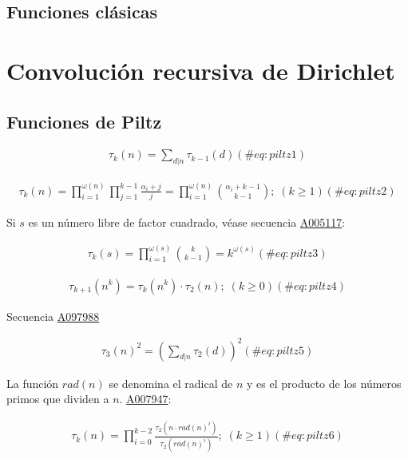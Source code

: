 \documentclass[
  letterpaper,
  DIV=11,
  numbers=noendperiod]{scrreprt}
\begin{document}
\hypertarget{funciones-cluxe1sicas}{%
\subsection{Funciones clásicas}\label{funciones-cluxe1sicas}}

\hypertarget{convoluciuxf3n-recursiva-de-dirichlet}{%
\section{Convolución recursiva de
Dirichlet}\label{convoluciuxf3n-recursiva-de-dirichlet}}

\hypertarget{funciones-de-piltz}{%
\subsection{Funciones de Piltz}\label{funciones-de-piltz}}

\begin{multline}
\tau_{k}(n)=\sum_{d|n}{\tau_{k-1}(d)}
(\#eq:piltz1)
\end{multline}

\begin{multline}
\tau_{k}(n)=\prod_{i=1}^{\omega(n)}{\prod_{j=1}^{k-1}\frac{\alpha_{i}+j}{j}}=
\prod_{i=1}^{\omega(n)}{\binom{\alpha_{i}+k-1}{k-1}}; \; (k \ge 1)
(\#eq:piltz2)
\end{multline}

Si \(s\) es un número libre de factor cuadrado, véase secuencia
\href{https://oeis.org/A005117}{A005117}:

\begin{multline}
\tau_{k}(s)= \prod_{i=1}^{\omega(s)}{\binom{k}{k-1}=k^{\omega(s)}}
(\#eq:piltz3)
\end{multline}

\begin{multline}
\tau_{k+1}(n^k)=\tau_{k}(n^k)\cdot \tau_2(n); \; (k \ge 0)
(\#eq:piltz4)
\end{multline}

Secuencia \href{https://oeis.org/A097988}{A097988}

\begin{multline}
\tau_{3}(n)^{2}=\left( \sum_{d|n}{\tau_{2}(d)} \right)^{2}
(\#eq:piltz5)
\end{multline}

La función \(rad(n)\) se denomina el radical de \(n\) y es el producto
de los números primos que dividen a \(n\).
\href{https://oeis.org/A007947}{A007947}:

\begin{multline}
\tau_{k}(n)=\prod_{i=0}^{k-2}{\frac{ \tau_{2}(n\cdot rad(n)^{i}) }{ \tau_{2}(rad(n)^{i})}} ; \; (k \ge 1)
(\#eq:piltz6)
\end{multline}
\end{document}

